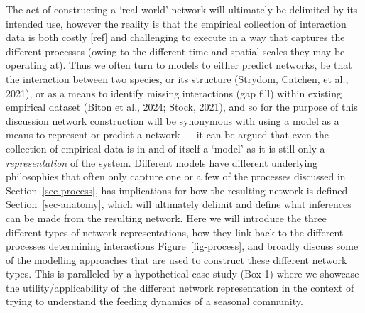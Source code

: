 \documentclass[
]{article}
\begin{document}
The act of constructing a `real world' network will ultimately be
delimited by its intended use, however the reality is that the empirical
collection of interaction data is both costly {[}ref{]} and challenging
to execute in a way that captures the different processes (owing to the
different time and spatial scales they may be operating at). Thus we
often turn to models to either predict networks, be that the interaction
between two species, or its structure (Strydom, Catchen, et al., 2021),
or as a means to identify missing interactions (gap fill) within
existing empirical dataset (Biton et al., 2024; Stock, 2021), and so for
the purpose of this discussion network construction will be synonymous
with using a model as a means to represent or predict a network --- it
can be argued that even the collection of empirical data is in and of
itself a `model' as it is still only a \emph{representation} of the
system. Different models have different underlying philosophies that
often only capture one or a few of the processes discussed in
Section~\ref{sec-process}, has implications for how the resulting
network is defined Section~\ref{sec-anatomy}, which will ultimately
delimit and define what inferences can be made from the resulting
network. Here we will introduce the three different types of network
representations, how they link back to the different processes
determining interactions Figure~\ref{fig-process}, and broadly discuss
some of the modelling approaches that are used to construct these
different network types. This is paralleled by a hypothetical case study
(Box 1) where we showcase the utility/applicability of the different
network representation in the context of trying to understand the
feeding dynamics of a seasonal community.
\end{document}
